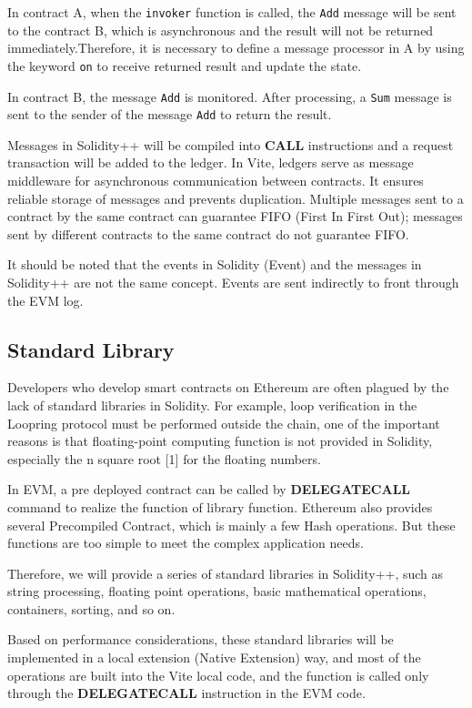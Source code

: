 \documentclass[UTF8,nofonts]{article}
\begin{document}
\begin{multicols}{2}
In contract A, when the \texttt{invoker} function is called, the \texttt{Add} message will be sent to the contract B, which is asynchronous and the result will not be returned immediately.Therefore, it is necessary to define a message processor in A by using the keyword \texttt{on} to receive  returned result and update the state.

In contract B, the message \texttt{Add} is monitored. After processing, a \texttt{Sum} message is sent to the sender of the message \texttt{Add} to return the result.

Messages in Solidity++ will be compiled into \textbf{CALL} instructions and a request transaction will be added to the ledger. In Vite, ledgers serve as message middleware for asynchronous communication between contracts. It ensures reliable storage of messages and prevents duplication. Multiple messages sent to a contract by the same contract can guarantee FIFO (First In First Out); messages sent by different contracts to the same contract do not guarantee FIFO.

It should be noted that the events in Solidity (Event) and the messages in Solidity++ are not the same concept. Events are sent indirectly to front through the EVM log.

\subsection{Standard Library}
Developers who develop smart contracts on Ethereum  are often plagued by the lack of standard libraries in Solidity. For example, loop verification in the Loopring protocol must be performed outside the chain, one of the important reasons is that floating-point computing function is not provided in Solidity, especially the n square root [1]\cite{loopring} for the floating numbers.

In EVM, a pre deployed contract can be called by \textbf{DELEGATECALL} command to realize the function of library function. Ethereum also provides several Precompiled Contract, which is mainly a few Hash operations. But these functions are too simple to meet the complex application needs.

Therefore, we will provide a series of standard libraries in Solidity++, such as string processing, floating point operations, basic mathematical operations, containers, sorting, and so on.

Based on performance considerations, these standard libraries will be implemented in a local extension (Native Extension) way, and most of the operations are built into the Vite local code, and the function is called only through the \textbf{DELEGATECALL} instruction in the EVM code.


\end{multicols}
\end{document}
